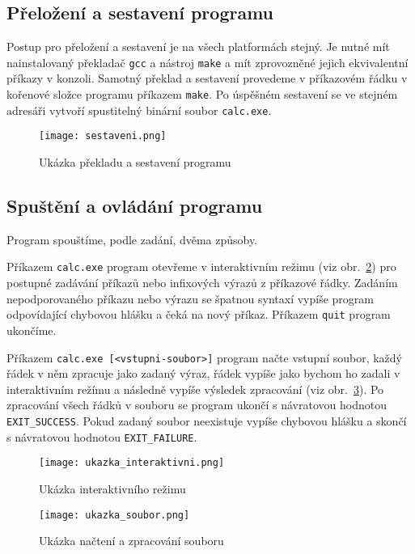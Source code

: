 \subsection{Přeložení a sestavení programu}
Postup pro přeložení a sestavení je na všech platformách stejný. Je nutné mít nainstalovaný překladač \verb|gcc| a nástroj \verb|make| a mít zprovozněné jejich ekvivalentní příkazy v konzoli. Samotný překlad a sestavení provedeme v příkazovém řádku v kořenové složce programu příkazem \verb|make|. Po úspěšném sestavení se ve stejném adresáři vytvoří spustitelný binární soubor \verb|calc.exe|.

\begin{figure}[ht]
    \centering
    \texttt{[image: sestaveni.png]}
    \caption{Ukázka překladu a sestavení programu}\label{fig:sestaveni}
\end{figure}

\subsection{Spuštění a ovládání programu}
Program spouštíme, podle zadání, dvěma způsoby. 

Příkazem \verb|calc.exe| program otevřeme v interaktivním režimu (viz obr.~\ref{fig:ukazka_interaktivni}) pro postupné zadávání příkazů nebo infixových výrazů z příkazové řádky. Zadáním nepodporovaného příkazu nebo výrazu se špatnou syntaxí vypíše program odpovídající chybovou hlášku a čeká na nový příkaz. Příkazem \verb|quit| program ukončíme.

Příkazem \verb|calc.exe [<vstupni-soubor>]| program načte vstupní soubor, každý řádek v něm zpracuje jako zadaný výraz, řádek vypíše jako bychom ho zadali v interaktivním režímu a následně vypíše výsledek zpracování (viz obr.~\ref{fig:ukazka_soubor}). Po zpracování všech řádků v souboru se program ukončí s návratovou hodnotou \verb|EXIT_SUCCESS|. Pokud zadaný soubor neexistuje vypíše chybovou hlášku a skončí s návratovou hodnotou \verb|EXIT_FAILURE|. 

\begin{figure}[ht]
    \centering
    \texttt{[image: ukazka\_interaktivni.png]}
    \caption{Ukázka interaktivního režimu}\label{fig:ukazka_interaktivni}
\end{figure}
\begin{figure}[ht]
    \centering
    \texttt{[image: ukazka\_soubor.png]}
    \caption{Ukázka načtení a zpracování souboru}\label{fig:ukazka_soubor}
\end{figure}